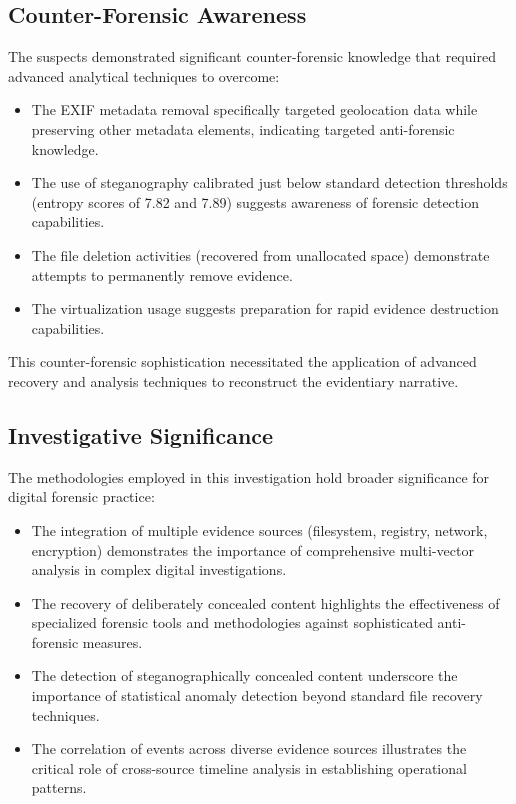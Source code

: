 \subsection{Counter-Forensic Awareness}
The suspects demonstrated significant counter-forensic knowledge that required advanced analytical techniques to overcome:

\begin{itemize}
    \item The EXIF metadata removal specifically targeted geolocation data while preserving other metadata elements, indicating targeted anti-forensic knowledge.
    
    \item The use of steganography calibrated just below standard detection thresholds (entropy scores of 7.82 and 7.89) suggests awareness of forensic detection capabilities.
    
    \item The file deletion activities (recovered from unallocated space) demonstrate attempts to permanently remove evidence.
    
    \item The virtualization usage suggests preparation for rapid evidence destruction capabilities.
\end{itemize}

This counter-forensic sophistication necessitated the application of advanced recovery and analysis techniques to reconstruct the evidentiary narrative.

\subsection{Investigative Significance}
The methodologies employed in this investigation hold broader significance for digital forensic practice:

\begin{itemize}
    \item The integration of multiple evidence sources (filesystem, registry, network, encryption) demonstrates the importance of comprehensive multi-vector analysis in complex digital investigations.
    
    \item The recovery of deliberately concealed content highlights the effectiveness of specialized forensic tools and methodologies against sophisticated anti-forensic measures.
    
    \item The detection of steganographically concealed content underscore the importance of statistical anomaly detection beyond standard file recovery techniques.
    
    \item The correlation of events across diverse evidence sources illustrates the critical role of cross-source timeline analysis in establishing operational patterns.
\end{itemize}

